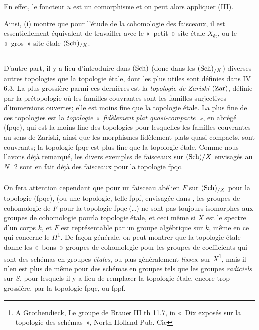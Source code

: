 \documentclass[10pt]{../fichiers-configuration-latex/smfart}
\begin{document}
En effet, le foncteur $u$ est un comorphisme et on peut alors
appliquer (III).

Ainsi, (i) montre que pour l'étude de la cohomologie des faisceaux,
il est essentiellement équivalent de travailler avec le
« petit » site étale $X_{\text{ét}}$, ou le « gros » site étale
$(\operatorname{Sch})_{/X}$.

\setcounter{subsection}{1}
\subsection{}

D'autre part, il y a lieu d'introduire dans $(\operatorname{Sch})$ (donc dans les
$(\operatorname{Sch})_{/X}$) diverses autres topologies que la topologie étale, dont
les plus utiles sont définies dans  IV 6.3. La plus grossière
parmi ces dernières est la \emph{topologie de Zariski} $(\operatorname{Zar})$, définie
par la prétopologie où les familles couvrantes sont les familles
surjectives d'immersions ouvertes; elle est moins fine que la
topologie étale. La plus fine de ces topologies est la \emph{topologie « fidèlement plat quasi-compacte »}, en abrégé (fpqc), qui est la moins
fine des topologies pour lesquelles les familles couvrantes au sens de
Zariski, ainsi que les morphismes fidèlement plats quasi-compacts,
sont couvrants; la topologie fpqc est plus fine que la topologie
étale. Comme nous l'avons déjà remarqué, les divers exemples de
faisceaux sur $(\operatorname{Sch})/X$ envisagés au $N^{\circ}$ 2 sont en fait déjà
des faisceaux pour la topologie fpqc.

\subsubsection{}

On fera attention cependant que pour un faisceau abélien $F$ sur
$(\operatorname{Sch})_{/X}$ pour la topologie (fpqc), (ou une topologie, telle
fppf, envisagée dans , les  groupes de cohomologie de $F$ pour
la topologie fpqc (\resp\ldots) ne sont pas toujours isomorphes aux
groupes de cohomologie pour\pageoriginale la topologie étale, et
ceci même si $X$ est le spectre d'un corps $k$, et $F$ est
représentable par un groupe algébrique sur $k$, même en ce qui
concerne le $H^{1}$. De façon générale, on peut montrer que la
topologie étale donne les « bons » groupes de cohomologie pour
les groupes de coefficients qui sont des schémas en groupes
\emph{étales}, ou plus généralement \emph{lisses}, sur
$X$\footnote{\Cf A Grothendieck, Le groupe de Brauer III th 11.7, in
« Dix exposés sur la topologie des schémas », North Holland Pub.
Cie}, mais il n'en est plus de même pour des schémas en groupes tels
que les groupes \emph{radiciels} sur $S$, pour lesquels il y a lieu
de remplacer la topologie étale, encore trop grossière, par la
topologie fpqc, ou fppf.
\end{document}
